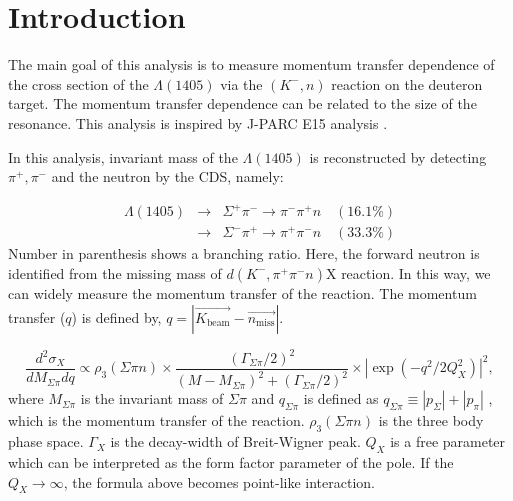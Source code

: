 \section{Introduction}
The main goal of this analysis is to measure momentum transfer dependence of the cross section of the $\Lambda (1405)$ via the $(K^-,n)$ reaction on the deuteron target.
The momentum transfer dependence can be related to the size of the resonance.
This analysis is inspired by J-PARC E15 analysis \cite{Sada:2016nkb,Ajimura:2018iyx}.

In this analysis, invariant mass of the $\Lambda (1405)$ is reconstructed by detecting $\pi^{+},\pi^-$ and the neutron by the CDS, namely:

\begin{eqnarray}
\Lambda (1405) & \rightarrow & \Sigma^+\pi^-  \rightarrow {\pi^-\pi^+}n \quad (16.1\%)  \nonumber \\
               & \rightarrow & \Sigma^-\pi^+  \rightarrow {\pi^+\pi^-}n \quad (33.3\%)
\end{eqnarray}
Number in parenthesis shows a branching ratio.
Here, the forward neutron is identified from the missing mass of 
$d(K^-,\pi^+\pi^-n)$X reaction. In this way, we can widely measure the momentum transfer of the \reaction reaction. 
The momentum transfer ($q$) is defined by, $q=|\overrightarrow{K_{\mbox{beam}}} - \overrightarrow{n_{\mbox{miss}}}|$.


\begin{equation} \label{formfactor} 
  \frac{d^2 \sigma _X}{dM_{\Sigma \pi} dq} \propto \rho _{3}(\Sigma \pi n) \times \frac{(\Gamma _{\Sigma \pi} /2)^2}{(M - M_{\Sigma \pi})^2 + (\Gamma _{\Sigma \pi} /2)^2 } \times  | \exp{(-q^2/2Q_{X}^2)}|^2 ,
\end{equation} 
where $M_{\Sigma \pi}$ is the invariant mass of $\Sigma \pi$ and $q_{\Sigma \pi}$ is defined as $ q_{\Sigma \pi} \equiv |p_\Sigma| + |p_\pi| $ , which is the momentum transfer of the reaction. $\rho_{3}(\Sigma \pi n) $ is the three body phase space. $\Gamma_X$ is the decay-width of Breit-Wigner peak. $Q_X$ is a free parameter which can be interpreted as the form factor parameter of the pole.  
If the $Q_X \to \infty $, the formula above becomes point-like interaction.

